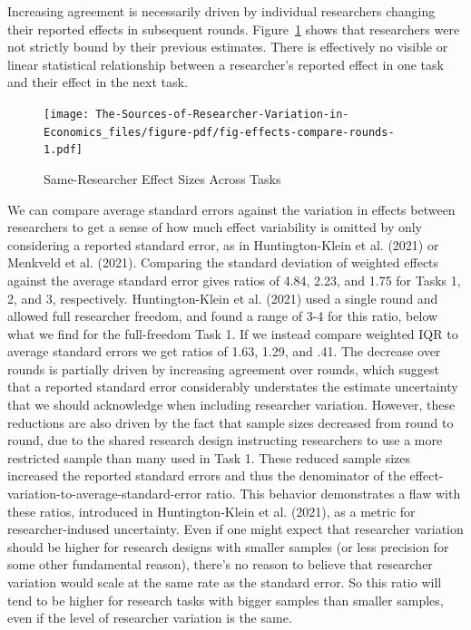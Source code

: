 \documentclass[
  letterpaper,
  DIV=11,
  numbers=noendperiod]{scrartcl}
\begin{document}
Increasing agreement is necessarily driven by individual researchers
changing their reported effects in subsequent rounds.
Figure~\ref{fig-effects-compare-rounds} shows that researchers were not
strictly bound by their previous estimates. There is effectively no
visible or linear statistical relationship between a researcher's
reported effect in one task and their effect in the next task.

\begin{figure}

{\centering \texttt{[image: The-Sources-of-Researcher-Variation-in-Economics\_files/figure-pdf/fig-effects-compare-rounds-1.pdf]}

}

\caption{\label{fig-effects-compare-rounds}Same-Researcher Effect Sizes
Across Tasks}

\end{figure}

We can compare average standard errors against the variation in effects
between researchers to get a sense of how much effect variability is
omitted by only considering a reported standard error, as in
Huntington-Klein et al. (2021) or Menkveld et al. (2021). Comparing the
standard deviation of weighted effects against the average standard
error gives ratios of 4.84, 2.23, and 1.75 for Tasks 1, 2, and 3,
respectively. Huntington-Klein et al. (2021) used a single round and
allowed full researcher freedom, and found a range of 3-4 for this
ratio, below what we find for the full-freedom Task 1. If we instead
compare weighted IQR to average standard errors we get ratios of 1.63,
1.29, and .41. The decrease over rounds is partially driven by
increasing agreement over rounds, which suggest that a reported standard
error considerably understates the estimate uncertainty that we should
acknowledge when including researcher variation. However, these
reductions are also driven by the fact that sample sizes decreased from
round to round, due to the shared research design instructing
researchers to use a more restricted sample than many used in Task 1.
These reduced sample sizes increased the reported standard errors and
thus the denominator of the effect-variation-to-average-standard-error
ratio. This behavior demonstrates a flaw with these ratios, introduced
in Huntington-Klein et al. (2021), as a metric for researcher-indused
uncertainty. Even if one might expect that researcher variation should
be higher for research designs with smaller samples (or less precision
for some other fundamental reason), there's no reason to believe that
researcher variation would scale at the same rate as the standard error.
So this ratio will tend to be higher for research tasks with bigger
samples than smaller samples, even if the level of researcher variation
is the same.
\end{document}
